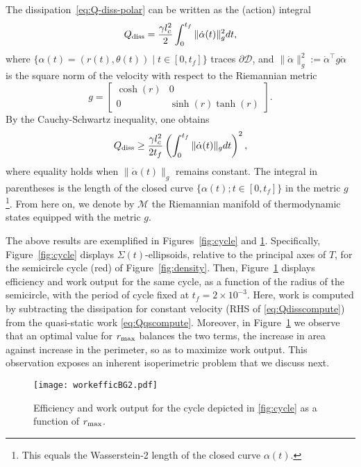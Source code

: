 \documentclass[
 reprint,
superscriptaddress,
 amsmath,amssymb,prl
 aps
]{revtex4-2}
\begin{document}
The dissipation~\eqref{eq:Q-diss-polar} can be written as the (action) integral
\begin{equation*}
    Q_{\rm diss} =\frac{\gamma { l_c^2}}{2}  \int_0^{t_f} \| \dot{\alpha}(t) \|_g^2 dt,
\end{equation*}
where $\{\alpha(t) = (r(t),\theta(t))\mid t\in[0,t_f]\}$ traces $\partial \mathcal D$, and $\|\dot{\alpha}\|_g^2 := \dot{\alpha}^\top g\dot{\alpha}$ is the square norm of the velocity with respect to the Riemannian metric
 \begin{equation*}
      g=\left[\begin{array}{cc}
           \cosh(r)&0\\
         0&\sinh(r) \tanh(r)
     \end{array}\right].
 \end{equation*}
 By the Cauchy-Schwartz inequality, one obtains
 \begin{equation}\label{eq:Qdisscompute}
    Q_{\rm diss} \geq \frac{\gamma { l_c^2}}{2t_f}  \left(\int_0^{t_f} \| \dot{\alpha}(t) \|_g dt \right)^2,
\end{equation}
where equality holds when $\|\dot{\alpha}(t)\|_g$ remains constant. The integral in parentheses is the length of the closed curve $\{\alpha(t);t\in[0,t_f]\}$ in the metric $g$ \footnote{This equals the Wasserstein-2 length of the closed curve $\alpha(t)$.}.
From here on, we denote by $\mathcal M$ the Riemannian manifold of thermodynamic states equipped with the metric $g$.

The above results are exemplified in Figures~\ref{fig:cycle} and \ref{fig:work-effic}. Specifically, Figure~\ref{fig:cycle} displays $\Sigma(t)$-ellipsoids, relative to the principal axes of $T$, for the semicircle cycle (red) of Figure~\ref{fig:density}. Then, Figure~\ref{fig:work-effic} displays efficiency and work output for the same cycle, as a function of the radius of the semicircle, with the period of cycle fixed at $t_f=2\times10^{-3}$. Here, work is computed by subtracting the dissipation for constant velocity (RHS of \eqref{eq:Qdisscompute}) from the quasi-static work \eqref{eq:Qqscompute}.
Moreover, in Figure~\ref{fig:work-effic} we observe that an optimal value for $r_{\rm max}$ balances the two terms, the increase in area against increase in the perimeter, so as to maximize work output. This observation exposes an inherent isoperimetric problem that we discuss next.

\begin{figure}[t]
    \centering
    \texttt{[image: workefficBG2.pdf]}
    \caption{Efficiency and work output for the cycle depicted in \ref{fig:cycle} as a function of $r_{\rm max}$. }
    \label{fig:work-effic}
\end{figure}
\end{document}
